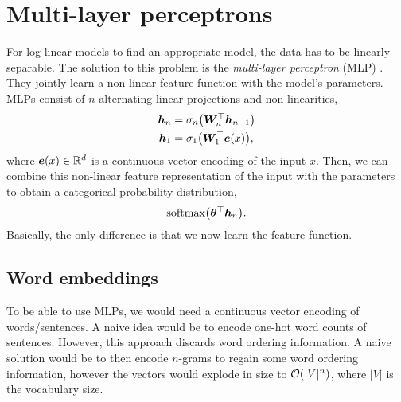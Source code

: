 \section{Multi-layer perceptrons} \label{sec:mlp}

For log-linear models to find an appropriate model, the data has to be linearly
separable. The
solution to this problem is the \textit{multi-layer perceptron}
(MLP) \citep{haykin1994neural}. They jointly learn a non-linear feature function
with the model's parameters. MLPs consist of $n$ alternating linear projections
and non-linearities,
\begin{align*}
  \vec{h}_n &= \sigma_n \lft( \transpose{\mat{W}_n} \vec{h}_{n-1} \rgt) \\
  \bm{h}_1 &= \sigma_1 \lft( \transpose{\mat{W}_1} \vec{e}(x) \rgt)
,\end{align*}
where $\bm{e}(x)\in\mathbb{R}^d$ is a continuous vector encoding of the input $x$.
Then, we can combine this non-linear feature representation of the input with
the parameters to obtain a categorical probability distribution, \[
  \text{softmax} \lft( \transpose{\vec{\theta}} \vec{h}_n \rgt)
.\]
Basically, the only difference is that we now learn the feature function.

\subsection{Word embeddings}

To be able to use MLPs, we would need a continuous vector encoding of
words/sentences. A naive idea would be to encode one-hot word counts of
sentences. However, this approach discards word ordering information. A naive
solution would be to then encode $n$-grams to regain some word ordering
information, however the vectors would explode in size to $\bigo{|V|^n}$, where
$|V|$ is the vocabulary size.

